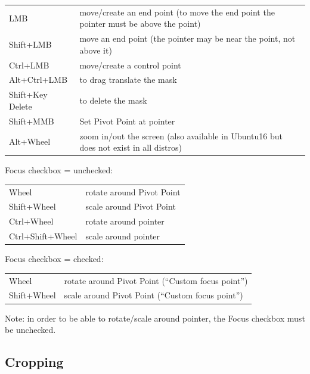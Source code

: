 \vspace{2ex}
\begin{tabular}{ l p{11cm}}
    \hline			
    LMB & move/create an end point (to move the end point the pointer must be above the point) \\
    Shift+LMB & move an end point (the pointer may be near the point, not above it) \\
    Ctrl+LMB & move/create a control point \\
    Alt+Ctrl+LMB & to drag translate the mask \\
    Shift+Key Delete & to delete the mask \\
    Shift+MMB & Set Pivot Point at pointer \\
    Alt+Wheel & zoom in/out the screen (also available in Ubuntu16 but does not exist in all distros) \\
    \hline  
\end{tabular}

\vspace{2ex}
Focus checkbox = unchecked:

\vspace{2ex}
\begin{tabular}{ l  l }
    \hline			
    Wheel & rotate around Pivot Point \\
    Shift+Wheel & scale around Pivot Point \\
    Ctrl+Wheel & rotate around pointer \\
    Ctrl+Shift+Wheel & scale around pointer \\
    
    \hline  
\end{tabular}

\vspace{2ex}
Focus checkbox = checked:

\vspace{2ex}
\begin{tabular}{ l  l }
    \hline			
    Wheel & rotate around Pivot Point (“Custom focus point”) \\
    Shift+Wheel & scale around Pivot Point (“Custom focus point”) \\       
    \hline  
\end{tabular}

\vspace{2ex}
Note: in order to be able to rotate/scale around pointer, the Focus checkbox must be unchecked.

\subsection{Cropping}%
\label{sub:cropping}

